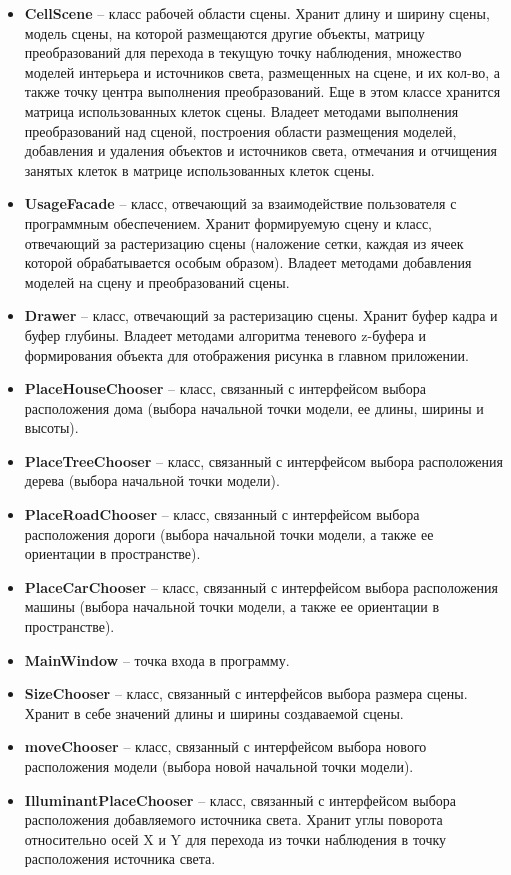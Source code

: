 \documentclass[a4paper,14pt, unknownkeysallowed]{extreport}
\begin{document}
\begin{itemize}
	\item \textbf{CellScene} -- класс рабочей области сцены. Хранит длину и ширину сцены, модель сцены, на которой размещаются другие объекты, матрицу преобразований для перехода в текущую точку наблюдения, множество моделей интерьера и источников света, размещенных на сцене, и их кол-во, а также точку центра выполнения преобразований. Еще в этом классе хранится матрица использованных клеток сцены. Владеет методами выполнения преобразований над сценой, построения области размещения моделей, добавления и удаления объектов и источников света, отмечания и отчищения занятых клеток в матрице использованных клеток сцены.
	\item \textbf{UsageFacade} -- класс, отвечающий за взаимодействие пользователя с программным обеспечением. Хранит формируемую сцену и класс, отвечающий за растеризацию сцены (наложение сетки, каждая из ячеек которой обрабатывается особым образом). Владеет методами добавления моделей на сцену и преобразований сцены.
	\item \textbf{Drawer} -- класс, отвечающий за растеризацию сцены. Хранит буфер кадра и буфер глубины. Владеет методами алгоритма теневого z-буфера и формирования объекта для отображения рисунка в главном приложении.
	\item \textbf{PlaceHouseChooser} -- класс, связанный с интерфейсом выбора расположения дома (выбора начальной точки модели, ее длины, ширины и высоты).
	\item \textbf{PlaceTreeChooser} -- класс, связанный с интерфейсом выбора расположения дерева (выбора начальной точки модели).
	\item \textbf{PlaceRoadChooser} -- класс, связанный с интерфейсом выбора расположения дороги (выбора начальной точки модели, а также ее ориентации в пространстве).
 	\item \textbf{PlaceCarChooser} -- класс, связанный с интерфейсом выбора расположения машины (выбора начальной точки модели, а также ее ориентации в пространстве).
	\item \textbf{MainWindow} -- точка входа в программу.
	\item \textbf{SizeChooser} -- класс, связанный с интерфейсов выбора размера сцены. Хранит в себе значений длины и ширины создаваемой сцены.
	\item \textbf{moveChooser} -- класс, связанный с интерфейсом выбора нового расположения модели (выбора новой начальной точки модели).
	\item \textbf{IlluminantPlaceChooser} -- класс, связанный с интерфейсом выбора расположения добавляемого источника света. Хранит углы поворота относительно осей X и Y для перехода из точки наблюдения в точку расположения источника света.

\end{itemize}
\end{document}
